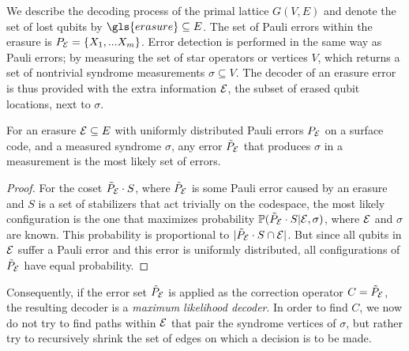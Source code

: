 We describe the decoding process of the primal lattice $G(V,E)$ and denote the set of lost qubits by $\gls{erasure}\subseteq E$. The set of Pauli errors within the erasure is $P_{\mathcal{E}} = \{X_1,...X_m\}$. Error detection is performed in the same way as Pauli errors; by measuring the set of star operators or vertices $V$, which returns a set of nontrivial syndrome measurements $\sigma \subseteq V$. The decoder of an erasure error is thus provided with the extra information $\mathcal{E}$, the subset of erased qubit locations, next to $\sigma$. 
\begin{lemma}\label{lem:peelinguni}
  For an erasure $\mathcal{E} \subseteq E$ with uniformly distributed Pauli errors $P_{\mathcal{E}}$ on a surface code, and a measured syndrome $\sigma$, any error  $\tilde{P}_{\mathcal{E}}$ that produces $\sigma$ in a measurement is the most likely set of errors. 
\end{lemma}
\begin{proof}
  For the coset $\tilde{P}_{\mathcal{E}}\cdot S$, where $\tilde{P}_{\mathcal{E}}$ is some Pauli error caused by an erasure and $S$ is a set of stabilizers that act trivially on the codespace, the most likely configuration is the one that maximizes probability $\mathbb{P}(\tilde{P}_{\mathcal{E}}\cdot S|\mathcal{E},\sigma)$, where $\mathcal{E}$ and $\sigma$ are known. This probability is proportional to $|\tilde{P}_{\mathcal{E}}\cdot S \cap\mathcal{E}|$. But since all qubits in $\mathcal{E}$ suffer a Pauli error and this error is uniformly distributed, all configurations of $\tilde{P}_{\mathcal{E}}$ have equal probability. 
\end{proof}

Consequently, if the error set $\tilde{P}_{\mathcal{E}}$ is applied as the correction operator $C=\tilde{P}_{\mathcal{E}}$, the resulting decoder is a \emph{maximum likelihood decoder}. In order to find $C$, we now do not try to find paths within $\mathcal{E}$ that pair the syndrome vertices of $\sigma$, but rather try to recursively shrink the set of edges on which a decision is to be made. 

